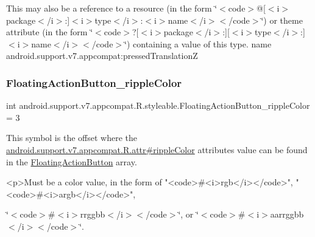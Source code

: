 This may also be a reference to a resource (in the form \char`\"{}$<$code$>$@\mbox{[}$<$i$>$package$<$/i$>$\+:\mbox{]}$<$i$>$type$<$/i$>$\+:$<$i$>$name$<$/i$>$$<$/code$>$\char`\"{}) or theme attribute (in the form \char`\"{}$<$code$>$?\mbox{[}$<$i$>$package$<$/i$>$\+:\mbox{]}\mbox{[}$<$i$>$type$<$/i$>$\+:\mbox{]}$<$i$>$name$<$/i$>$$<$/code$>$\char`\"{}) containing a value of this type.  name android.\+support.\+v7.\+appcompat\+:pressed\+TranslationZ \mbox{\label{classandroid_1_1support_1_1v7_1_1appcompat_1_1R_1_1styleable_a1b00a775eb9bce08afe75deef83f51f1}} 
\subsubsection{\texorpdfstring{Floating\+Action\+Button\+\_\+ripple\+Color}{FloatingActionButton\_rippleColor}}
{\footnotesize\ttfamily int android.\+support.\+v7.\+appcompat.\+R.\+styleable.\+Floating\+Action\+Button\+\_\+ripple\+Color = 3\hspace{0.3cm}{\ttfamily [static]}}

This symbol is the offset where the \hyperlink{classandroid_1_1support_1_1v7_1_1appcompat_1_1R_1_1attr_a48d6a24411e563366d3c82b2505a0e8c}{android.\+support.\+v7.\+appcompat.\+R.\+attr\#ripple\+Color} attribute\textquotesingle{}s value can be found in the \hyperlink{classandroid_1_1support_1_1v7_1_1appcompat_1_1R_1_1styleable_a9bfca89352160169125a89277e9fb2a1}{Floating\+Action\+Button} array.

\begin{DoxyVerb}      <p>Must be a color value, in the form of "<code>#<i>rgb</i></code>", "<code>#<i>argb</i></code>",
\end{DoxyVerb}
 \char`\"{}$<$code$>$\#$<$i$>$rrggbb$<$/i$>$$<$/code$>$\char`\"{}, or \char`\"{}$<$code$>$\#$<$i$>$aarrggbb$<$/i$>$$<$/code$>$\char`\"{}. 

